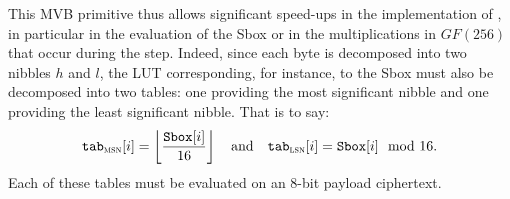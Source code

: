 This MVB primitive thus allows significant speed-ups in the implementation of \cite{DBLP:conf/wahc/TramaCBS23}, in particular in the evaluation of the Sbox or in the multiplications in $GF(256)$ that occur during the \MixColumns step. Indeed, since each byte is decomposed into two nibbles $h$ and $l$, the LUT corresponding, for instance, to the Sbox must also be decomposed into two tables: one providing the most significant nibble and one providing the least significant nibble. That is to say: 
$$
\texttt{tab}_{\textsc{msn}}[i] = \left\lfloor \frac{\texttt{Sbox}[i]}{16} \right\rfloor \quad \text{and} \quad \texttt{tab}_{\textsc{lsn}}[i] = \texttt{Sbox}[i] \mod 16.
$$
Each of these tables must be evaluated on an 8-bit payload ciphertext. 



